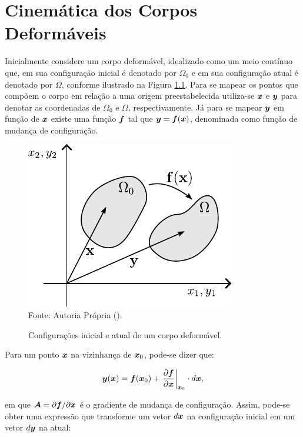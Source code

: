 \chapter[APÊNDICE \ref{Ap:CSD}]{Cinemática dos Corpos Deformáveis}
\label{Ap:CSD}


Inicialmente considere um corpo deformável, idealizado como um meio contínuo que, em sua configuração inicial é denotado por $\Omega_0$ e em sua configuração atual é denotado por $\Omega$, conforme ilustrado na Figura \ref{fig:Cont}. Para se mapear os pontos que compõem o corpo em relação a uma origem preestabelecida utiliza-se $\boldsymbol{x}$ e $\boldsymbol{y}$ para denotar as coordenadas de $\Omega_0$ e $\Omega$, respectivamente. Já para se mapear $\boldsymbol{y}$ em função de $\boldsymbol{x}$ existe uma função $\boldsymbol{f}$ tal que $\boldsymbol{y}=\boldsymbol{f}(\boldsymbol{x})$, denominada como função de mudança de configuração.

\begin{figure}[h!]
    \centering
    \caption{Configurações inicial e atual de um corpo deformável.}
    \includegraphics[width=.4\linewidth]{Figuras/Cont.pdf}
    \\Fonte: Autoria Própria (\the\year).
    \label{fig:Cont}
\end{figure}

Para um ponto $\boldsymbol{x}$ na vizinhança de $\boldsymbol{x}_0$, pode-se dizer que:

\begin{equation}
    \boldsymbol{y}(\boldsymbol{x})=\boldsymbol{f}(\boldsymbol{x}_0)+\left.\frac{\partial{\boldsymbol{f}}}{\partial{\boldsymbol{x}}}\right|_{\boldsymbol{x}_0}\cdot d\boldsymbol{x}\text{,}
\end{equation}

\noindent em que $\boldsymbol{A}=\partial\boldsymbol{f}/\partial\boldsymbol{x}$ é o gradiente de mudança de configuração. Assim, pode-se obter uma expressão que transforme um vetor $d\boldsymbol{x}$ na configuração inicial em um vetor $d\boldsymbol{y}$ na atual:

